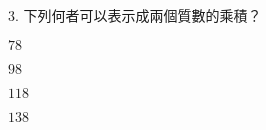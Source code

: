 \documentclass[12pt]{article}
\begin{document}
\begin{problem}
  \item[3.] 下列何者可以表示成兩個質數的乘積？
  \begin{choices}
    \item $78$
    \item $98$
    \item $118$
    \item $138$
  \end{choices}
\end{problem}
\end{document}
